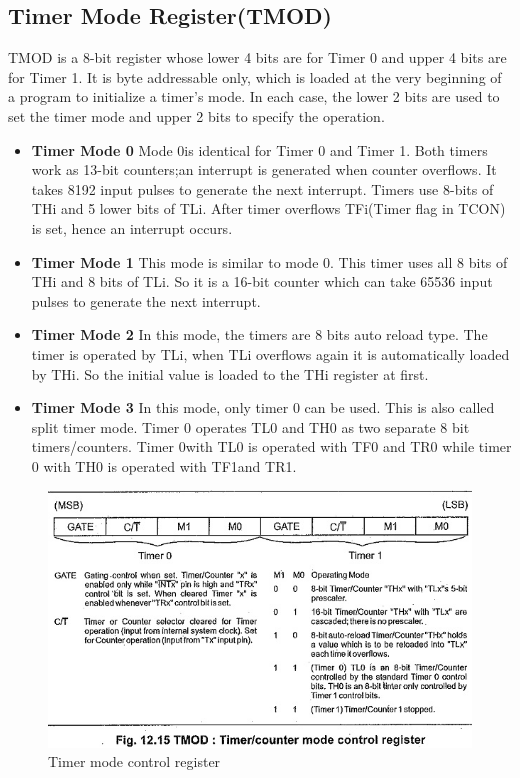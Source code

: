 \documentclass{article}
\begin{document}
\subsection{Timer Mode Register(TMOD)}
TMOD is a 8-bit register whose lower 4 bits are for Timer 0 and upper
4 bits are for Timer 1.
It  is  byte  addressable  only,  which  is loaded  at  the  very beginning  of  a  program  to  initialize  a  timer's  mode.
In each case, the lower 2 bits are used to
set the timer mode and upper 2 bits to specify the operation.
\begin{itemize}
    \item \textbf{Timer Mode 0}
          Mode  0is identical  for  Timer  0  and  Timer  1.  Both  timers  work  as  13-bit counters;an  interrupt is generated  when  counter  overflows.  It  takes  8192  input  pulses  to  generate  the  next interrupt. Timers  use  8-bits  of  THi  and  5  lower  bits  of  TLi.  After  timer  overflows  TFi(Timer flag  in TCON) is set, hence an interrupt occurs.

    \item \textbf{Timer Mode 1}
          This mode is similar to mode 0. This timer uses all 8 bits of THi and 8 bits of TLi. So it is a 16-bit counter which can take 65536 input pulses to generate the next interrupt.

    \item \textbf{Timer Mode 2}
          In  this  mode,  the  timers  are  8  bits  auto  reload  type.  The  timer  is  operated by  TLi, when TLi overflows again it is automatically loaded by THi. So the initial value is loaded to the THi register at first.

    \item \textbf{Timer Mode 3}
          In this mode, only timer 0 can be used. This is also called split timer mode. Timer 0 operates  TL0  and  TH0  as  two  separate  8  bit  timers/counters.  Timer  0with  TL0  is  operated with TF0 and TR0 while timer 0 with TH0 is operated with TF1and TR1.

\end{itemize}

\begin{figure}[H]
    \centering
    \includegraphics[scale=0.89,cframe=blue 0.5pt 3pt]{./Timer mode.jpg}
    \caption{Timer mode control register}
\end{figure}
\end{document}
